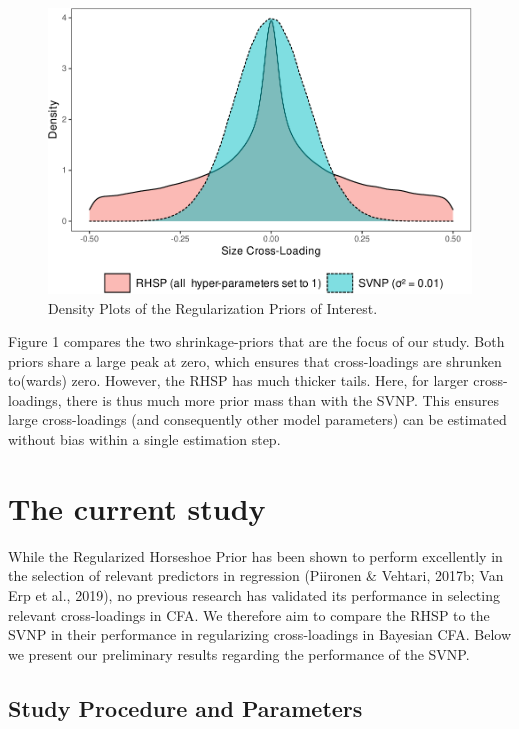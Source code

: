 \documentclass[
  man, donotrepeattitle,floatsintext]{apa6}
\begin{document}
\begin{figure}
\centering
\includegraphics{JMBKoch_thesis_files/figure-latex/unnamed-chunk-1-1.pdf}
\caption{\label{fig:unnamed-chunk-1}Density Plots of the Regularization Priors of Interest.}
\end{figure}

Figure 1 compares the two shrinkage-priors that are the focus of our study. Both priors share a large peak at zero, which ensures that cross-loadings are shrunken to(wards) zero. However, the RHSP has much thicker tails. Here, for larger cross-loadings, there is thus much more prior mass than with the SVNP. This ensures large cross-loadings (and consequently other model parameters) can be estimated without bias within a single estimation step.

\hypertarget{the-current-study}{%
\section{The current study}\label{the-current-study}}

While the Regularized Horseshoe Prior has been shown to perform excellently in the selection of relevant predictors in regression (Piironen \& Vehtari, 2017b; Van Erp et al., 2019), no previous research has validated its performance in selecting relevant cross-loadings in CFA. We therefore aim to compare the RHSP to the SVNP in their performance in regularizing cross-loadings in Bayesian CFA. Below we present our preliminary results regarding the performance of the SVNP.

\hypertarget{study-procedure-and-parameters}{%
\subsection{Study Procedure and Parameters}\label{study-procedure-and-parameters}}
\end{document}
